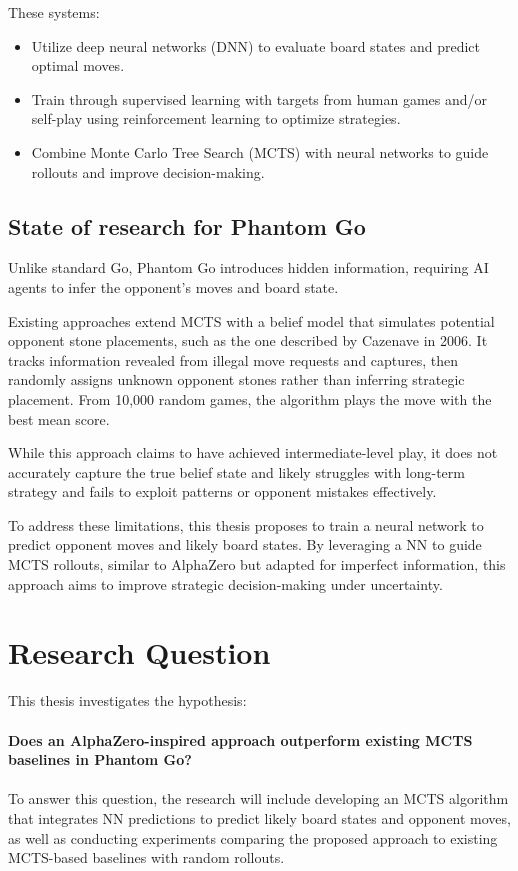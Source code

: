 \documentclass[12pt,oneside,openright]{article}
\begin{document}
These systems:
\begin{itemize}
  \item Utilize deep neural networks (DNN) to evaluate board states and predict optimal moves.
  \item Train through supervised learning with targets from human games and/or self-play using reinforcement learning to optimize strategies.
  \item Combine Monte Carlo Tree Search (MCTS) with neural networks to guide rollouts and improve decision-making.
\end{itemize}

\subsection{State of research for Phantom Go}

Unlike standard Go, Phantom Go introduces hidden information, requiring AI agents to infer the opponent’s moves and board state.

Existing approaches extend MCTS with a belief model that simulates potential opponent stone placements, such as the one described by Cazenave in 2006\cite{Cazenave2006}.
It tracks information revealed from illegal move requests and captures, then randomly assigns unknown opponent stones rather than inferring strategic placement. From 10,000 random games, the algorithm plays the move with the best mean score.

While this approach claims to have achieved intermediate-level play, it does not accurately capture the true belief state and likely struggles with long-term strategy and fails to exploit patterns or opponent mistakes effectively.

To address these limitations, this thesis proposes to train a neural network to predict opponent moves and likely board states. By leveraging a NN to guide MCTS rollouts, similar to AlphaZero but adapted for imperfect information, this approach aims to improve strategic decision-making under uncertainty.

\section{Research Question}

This thesis investigates the hypothesis:
\\
\\
\textbf{Does an AlphaZero-inspired approach outperform existing MCTS baselines in Phantom Go?}
\\
\\
To answer this question, the research will include developing an MCTS algorithm that integrates NN predictions to predict likely board states and opponent moves, as well as conducting experiments comparing the proposed approach to existing MCTS-based baselines with random rollouts.
\end{document}
